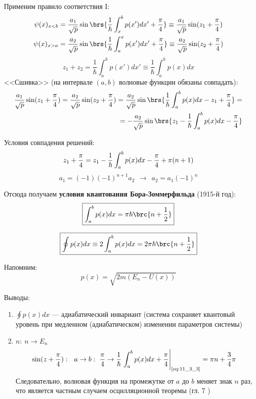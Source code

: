Применим правило соответствия I:
$$
\begin{gathered}
\psi(x)_{x<b} = \frac{a_1}{\sqrt{p}} \sin\brs{\frac{1}{\hbar} \int_{x}^{b} p(x')dx' + \frac{\pi}{4} } \equiv \frac{a_1}{\sqrt{p}} \sin({z_1 + \frac{\pi}{4}}) \\
\psi(x)_{x>a} = \frac{a_2}{\sqrt{p}} \sin\brs{\frac{1}{\hbar} \int_{a}^{x} p(x')dx' + \frac{\pi}{4} } \equiv \frac{a_2}{\sqrt{p}} \sin({z_2 + \frac{\pi}{4}})
\end{gathered}
$$
$$
z_1+z_2 = \frac{1}{\hbar} \int_{a}^{b} p(x')dx' \equiv \frac{1}{\hbar} \int_{a}^{b} p(x)dx
$$
<<Сшивка>> (на интервале $(a, b)$ волновые функции обязаны совпадать):
$$
\begin{aligned}
\frac{a_1}{\sqrt{p}} \sin({z_1+\frac{\pi}{4}}) = \frac{a_2}{\sqrt{p}} \sin({z_2+\frac{\pi}{4}}) = \frac{a_2}{\sqrt{p}} \sin\brs{\frac{1}{\hbar} \int_{a}^{b} p(x)dx - z_1 + \frac{\pi}{4}} = \\
= -\frac{a_2}{\sqrt{p}} \sin\brs{z_1 - \frac{1}{\hbar} \int_{a}^{b} p(x)dx - \frac{\pi}{4} }
\end{aligned}
$$

Условия совпадения решений:
\begin{equation}
\label{eq:11_3_1}
z_1 + \frac{\pi}{4} = z_1 - \frac{1}{\hbar} \int_{a}^{b} p(x)dx - \frac{\pi}{4} + \pi(n+1) \\
\end{equation}
\begin{equation}
\label{eq:11_3_2}
a_1 = (-1)(-1)^{n+1}a_2  ~~\rightarrow~~ a_2 = a_1 (-1)^n
\end{equation}

Отсюда получаем \textbf{условия квантования Бора-Зоммерфильда} (1915-й год):
\begin{equation}
\label{eq:11_3_3}
\boxed{\int_{a}^{b} p(x)dx = \pi\hbar\brc{n+\frac{1}{2}}}
\end{equation}

\begin{equation}
\label{eq:11_3_4}
\boxed{\oint p(x)dx \equiv 2\int_{a}^{b} p(x)dx = 2\pi\hbar\brc{n+\frac{1}{2}}}
\end{equation}

Напомним:
$$
p(x) = \sqrt{2m(E_n - U(x))}
$$

Выводы:
\begin{enumerate}
\item $\oint p(x)dx $ --- адиабатический инвариант (система сохраняет квантовый уровень при медленном (адиабатическом) изменении параметров системы)
\item $n:~ n \to E_n$
$$
\sin({z+\frac{\pi}{4}}):~~ a \to b:~ \frac{\pi}{4} \to \frac{1}{\hbar} \left. \int_{a}^{b} p(x)dx + \frac{\pi}{4} \right|_{\text{\eqref{eq:11_3_3}}} =
\pi n + \frac{3}{4}\pi
$$
Следовательно, волновая функция на промежутке от $a$ до $b$ меняет знак $n$ раз, что является частным случаем осцилляционной теоремы (гл. 7 )
\end{enumerate}


